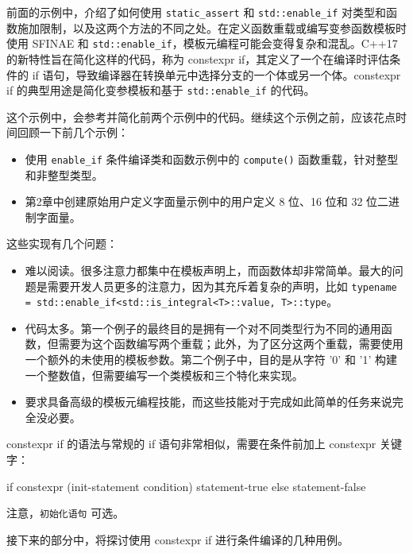 
前面的示例中，介绍了如何使用 \verb|static_assert| 和 \verb|std::enable_if| 对类型和函数施加限制，以及这两个方法的不同之处。在定义函数重载或编写变参函数模板时使用 SFINAE 和 \verb|std::enable_if|，模板元编程可能会变得复杂和混乱。C++17 的新特性旨在简化这样的代码，称为 constexpr if，其定义了一个在编译时评估条件的 if 语句，导致编译器在转换单元中选择分支的一个体或另一个体。constexpr if 的典型用途是简化变参模板和基于 \verb|std::enable_if| 的代码。


这个示例中，会参考并简化前两个示例中的代码。继续这个示例之前，应该花点时间回顾一下前几个示例：

\begin{itemize}
\item
使用 \verb|enable_if| 条件编译类和函数示例中的 \verb|compute()| 函数重载，针对整型和非整型类型。

\item
第2章中创建原始用户定义字面量示例中的用户定义 8 位、16 位和 32 位二进制字面量。
\end{itemize}

这些实现有几个问题：

\begin{itemize}
\item
难以阅读。很多注意力都集中在模板声明上，而函数体却非常简单。最大的问题是需要开发人员更多的注意力，因为其充斥着复杂的声明，比如 \verb|typename = std::enable_if<std::is_integral<T>::value, T>::type|。

\item
代码太多。第一个例子的最终目的是拥有一个对不同类型行为不同的通用函数，但需要为这个函数编写两个重载；此外，为了区分这两个重载，需要使用一个额外的未使用的模板参数。第二个例子中，目的是从字符 '0' 和 '1' 构建一个整数值，但需要编写一个类模板和三个特化来实现。

\item
要求具备高级的模板元编程技能，而这些技能对于完成如此简单的任务来说完全没必要。
\end{itemize}

constexpr if 的语法与常规的 if 语句非常相似，需要在条件前加上 constexpr 关键字：

\begin{cpp}
if constexpr (init-statement condition) statement-true
else statement-false
\end{cpp}

注意，\verb|初始化语句| 可选。

接下来的部分中，将探讨使用 constexpr if 进行条件编译的几种用例。

